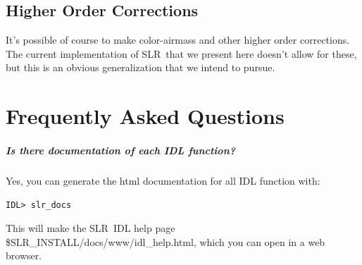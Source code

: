 \documentclass{report}
\newcommand{\slr}{SLR}
\begin{document}
\section{Higher Order Corrections}


It's possible of course to make color-airmass and other higher order
corrections.  The current implementation of \slr\ that we present here
doesn't allow for these, but this is an obvious generalization that we
intend to pursue.








\chapter{Frequently Asked Questions}


\paragraph{Is there documentation of each IDL function?}

Yes, you can generate the html documentation for all IDL function
with:
\begin{verbatim}
IDL> slr_docs
\end{verbatim}
This will make the \slr\ IDL help page
\$SLR\_INSTALL/docs/www/idl\_help.html, which you can open in a web
browser.







\end{document}
